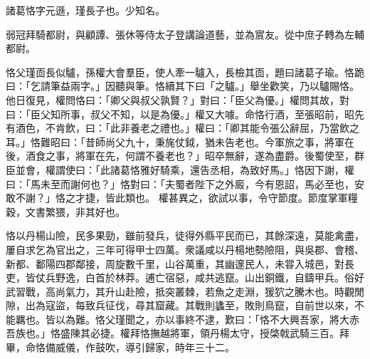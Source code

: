 \begin{pinyinscope}
 
 
 諸葛恪字元遜，瑾長子也。少知名。
 
 
 弱冠拜騎都尉，與顧譚、張休等侍太子登講論道藝，並為賔友。從中庶子轉為左輔都尉。
 
 
恪父瑾靣長似驢，孫權大會羣臣，使人牽一驢入，長檢其靣，題曰諸葛子瑜。恪跪曰：「乞請筆益兩字。」因聽與筆。恪續其下曰「之驢。」舉坐歡笑，乃以驢賜恪。他日復見，權問恪曰：「卿父與叔父孰賢？」對曰：「臣父為優。」權問其故，對曰：「臣父知所事，叔父不知，以是為優。」權又大噱。命恪行酒，至張昭前，昭先有酒色，不肯飲，曰：「此非養老之禮也。」權曰：「卿其能令張公辭屈，乃當飲之耳。」恪難昭曰：「昔師尚父九十，秉旄仗鉞，猶未告老也。今軍旅之事，將軍在後，酒食之事，將軍在先，何謂不養老也？」昭卒無辭，遂為盡爵。後蜀使至，群臣並會，權謂使曰：「此諸葛恪雅好騎乘，還告丞相，為致好馬。」恪因下謝，權曰：「馬未至而謝何也？」恪對曰：「夫蜀者陛下之外廄，今有恩詔，馬必至也，安敢不謝？」恪之才捷，皆此類也。
 權甚異之，欲試以事，令守節度。節度掌軍糧穀，文書繁猥，非其好也。
 
 
 
 
 恪以丹楊山險，民多果勁，雖前發兵，徒得外縣平民而已，其餘深遠，莫能禽盡，屢自求乞為官出之，三年可得甲士四萬。衆議咸以丹楊地勢險阻，與吳郡、會稽、新都、鄱陽四郡鄰接，周旋數千里，山谷萬重，其幽邃民人，未甞入城邑，對長吏，皆仗兵野逸，白首於林莽。逋亡宿惡，咸共逃竄。山出銅鐵，自鑄甲兵。俗好武習戰，高尚氣力，其升山赴險，抵突叢棘，若魚之走淵，猨狖之騰木也。時觀閒隙，出為寇盜，每致兵征伐，尋其窟藏。其戰則蠭至，敗則鳥竄，自前世以來，不能羈也。皆以為難。恪父瑾聞之，亦以事終不逮，歎曰：「恪不大興吾家，將大赤吾族也。」恪盛陳其必捷。權拜恪撫越將軍，領丹楊太守，授棨戟武騎三百。拜畢，命恪備威儀，作鼓吹，導引歸家，時年三十二。
 

\end{pinyinscope}
